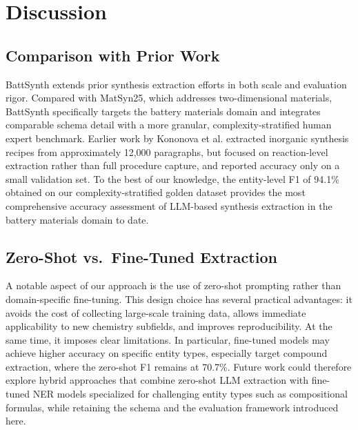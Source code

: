 \documentclass[12pt,a4paper]{article}
\begin{document}
\section{Discussion}
\label{sec:discussion}

\subsection{Comparison with Prior Work}

BattSynth extends prior synthesis extraction efforts in both scale and evaluation rigor. Compared with MatSyn25,\cite{song2023matsyn25} which addresses two-dimensional materials, BattSynth specifically targets the battery materials domain and integrates comparable schema detail with a more granular, complexity-stratified human expert benchmark. Earlier work by Kononova et al.\cite{kononova2019text} extracted inorganic synthesis recipes from approximately 12,000 paragraphs, but focused on reaction-level extraction rather than full procedure capture, and reported accuracy only on a small validation set. To the best of our knowledge, the entity-level F1 of 94.1\% obtained on our complexity-stratified golden dataset provides the most comprehensive accuracy assessment of LLM-based synthesis extraction in the battery materials domain to date.

\subsection{Zero-Shot vs.\ Fine-Tuned Extraction}

A notable aspect of our approach is the use of zero-shot prompting rather than domain-specific fine-tuning. This design choice has several practical advantages: it avoids the cost of collecting large-scale training data, allows immediate applicability to new chemistry subfields, and improves reproducibility. At the same time, it imposes clear limitations. In particular, fine-tuned models may achieve higher accuracy on specific entity types, especially target compound extraction, where the zero-shot F1 remains at 70.7\%. Future work could therefore explore hybrid approaches that combine zero-shot LLM extraction with fine-tuned NER models specialized for challenging entity types such as compositional formulas, while retaining the schema and the evaluation framework introduced here.
\end{document}
